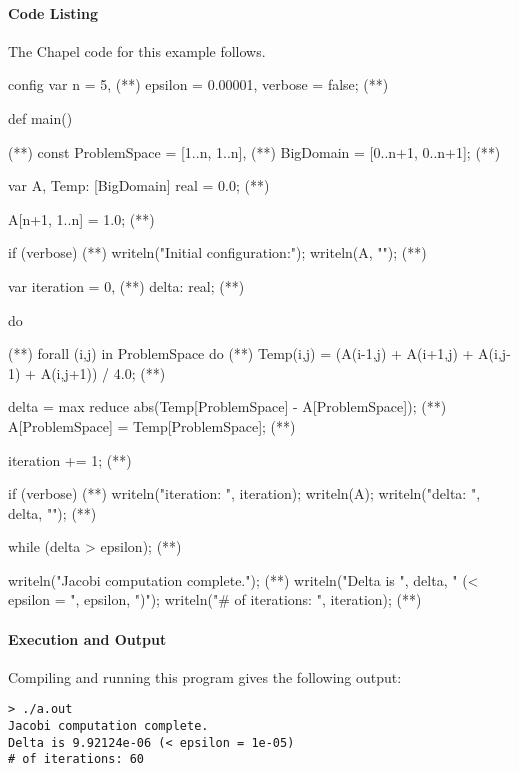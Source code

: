 \paragraph{Code Listing}
The Chapel code for this example follows.  
\begin{numberedchapel}
config var n = 5,                  (*\label{jac_config_start}*)
           epsilon = 0.00001,
           verbose = false;        (*\label{jac_config_end}*)

def main() {                       (*\label{jac_main}*)
  const ProblemSpace = [1..n, 1..n],  (*\label{problem_space}*)
        BigDomain = [0..n+1, 0..n+1]; (*\label{big_domain}*)

  var A, Temp: [BigDomain] real = 0.0; (*\label{a_temp_decl}*)

  A[n+1, 1..n] = 1.0;                 (*\label{a_init_last_row}*)

  if (verbose) {                      (*\label{verbose_init_start}*)
    writeln("Initial configuration:");
    writeln(A, "\n");
  }                                   (*\label{verbose_init_end}*)

  var iteration = 0,                  (*\label{jac_var_start}*)
      delta: real;                    (*\label{jac_var_end}*)

  do {                                (*\label{jac_do_start}*)
    forall (i,j) in ProblemSpace do   (*\label{jac_forall}*)
      Temp(i,j) = (A(i-1,j) + A(i+1,j) + A(i,j-1) + A(i,j+1)) / 4.0; (*\label{jac_iter}*)

    delta = max reduce abs(Temp[ProblemSpace] - A[ProblemSpace]); (*\label{jac_reduce}*)
    A[ProblemSpace] = Temp[ProblemSpace]; (*\label{jac_update_A}*)

    iteration += 1; (*\label{jac_advance_iteration}*)

    if (verbose) {  (*\label{verbose_iter_start}*)
      writeln("iteration: ", iteration);
      writeln(A);
      writeln("delta: ", delta, "\n");
    }               (*\label{verbose_iter_end}*)
  } while (delta > epsilon);          (*\label{jac_do_end}*)

  writeln("Jacobi computation complete.");  (*\label{jac_output_start}*)
  writeln("Delta is ", delta, " (< epsilon = ", epsilon, ")");
  writeln("# of iterations: ", iteration); (*\label{jac_output_end}*)
}
\end{numberedchapel}

\paragraph{Execution and Output}
Compiling and running this program gives the following output:
{\small
\begin{verbatim}
> ./a.out
Jacobi computation complete.
Delta is 9.92124e-06 (< epsilon = 1e-05)
# of iterations: 60
\end{verbatim}}

